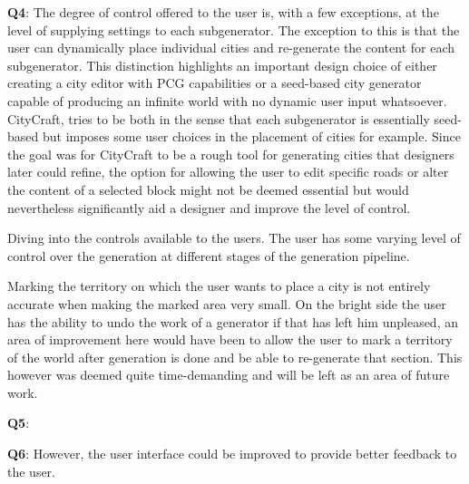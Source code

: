 \textbf{Q4}: \newline
The degree of control offered to the user is, with a few exceptions, at the level of supplying settings to each subgenerator.
The exception to this is that the user can dynamically place individual cities and re-generate the content for each subgenerator.
This distinction highlights an important design choice of either creating a city editor with PCG capabilities or a seed-based city generator capable of producing an infinite world with no dynamic user input whatsoever.
CityCraft, tries to be both in the sense that each subgenerator is essentially seed-based but imposes some user choices in the placement of cities for example.
Since the goal was for CityCraft to be a rough tool for generating cities that designers later could refine, the option for allowing the user to edit specific roads or alter the content of a selected block might not be deemed essential but would nevertheless significantly aid a designer and improve the level of control.

Diving into the controls available to the users.
The user has some varying level of control over the generation at different stages of the generation pipeline.

Marking the territory on which the user wants to place a city is not entirely accurate when making the marked area very small. 
On the bright side the user has the ability to undo the work of a generator if that has left him unpleased, an area of improvement here would have been to allow the user to mark a territory of the world after generation is done and be able to re-generate that section.
This however was deemed quite time-demanding and will be left as an area of future work. 

\textbf{Q5}: \newline


\textbf{Q6}: \newline
However, the user interface could be improved to provide better feedback to the user.

